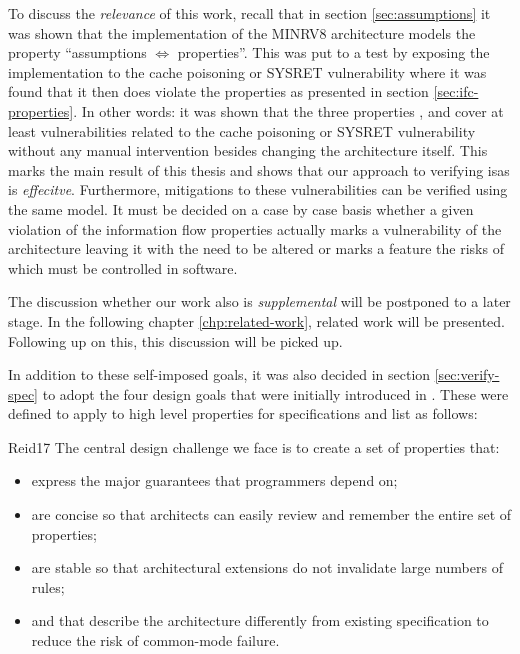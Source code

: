 To discuss the \textit{relevance} of this work, recall that in section \ref{sec:assumptions} it was shown that the implementation of the MINRV8 architecture models the property \enquote{assumptions $ \Leftrightarrow $ properties}.
This was put to a test by exposing the implementation to the cache poisoning or SYSRET vulnerability where it was found that it then does violate the properties as presented in section \ref{sec:ifc-properties}.
In other words: it was shown that the three properties ,  and  cover at least vulnerabilities related to the cache poisoning or SYSRET vulnerability without any manual intervention besides changing the architecture itself.
This marks the main result of this thesis and shows that our approach to verifying \glspl{isa} is \textit{effecitve}.
Furthermore, mitigations to these vulnerabilities can be verified using the same model.
It must be decided on a case by case basis whether a given violation of the information flow properties actually marks a vulnerability of the architecture leaving it with the need to be altered or marks a feature the risks of which must be controlled in software.

The discussion whether our work also is \textit{supplemental} will be postponed to a later stage.
In the following chapter \ref{chp:related-work}, related work will be presented.
Following up on this, this discussion will be picked up.

In addition to these self-imposed goals, it was also decided in section \ref{sec:verify-spec} to adopt the four design goals that were initially introduced in \cite{Reid17}.
These were defined to apply to high level properties for specifications and list as follows:
\begin{displaycquote}[pp.88:2-3]{Reid17}
    The central design challenge we face is to create a set of properties that:
    \begin{itemize}
        \item express the major guarantees that programmers depend on;
        \item are concise so that architects can easily review and remember the entire set of properties;
        \item are stable so that architectural extensions do not invalidate large numbers of rules;
        \item and that describe the architecture differently from existing specification to reduce the risk of common-mode failure.
    \end{itemize}
\end{displaycquote}

